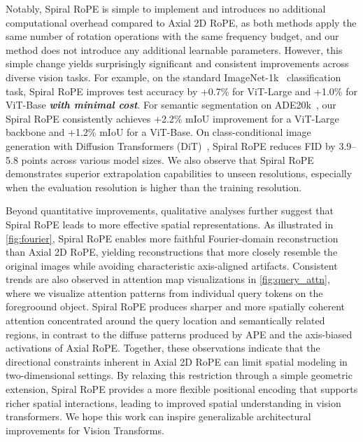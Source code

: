 Notably, Spiral RoPE is simple to implement and introduces no additional computational overhead compared to Axial 2D RoPE, as both methods apply the same number of rotation operations with the same frequency budget, and our method does not introduce any additional learnable parameters. However, this simple change yields surprisingly significant and consistent improvements across diverse vision tasks. For example, on the standard ImageNet-1k~\cite{dengImageNetLargescaleHierarchical2009} classification task, Spiral RoPE improves test accuracy by +0.7\% for ViT-Large and +1.0\% for ViT-Base \textit{\textbf{with minimal cost}}. For semantic segmentation on ADE20k~\cite{zhouSceneParsingADE20K2017a}, our Spiral RoPE consistently achieves +2.2\% mIoU improvement for a ViT-Large backbone and +1.2\% mIoU for a ViT-Base. On class-conditional image generation with Diffusion Transformers (DiT)~\cite{peeblesScalableDiffusionModels2023}, Spiral RoPE reduces FID by 3.9--5.8 points across various model sizes. We also observe that Spiral RoPE demonstrates superior extrapolation capabilities to unseen resolutions, especially when the evaluation resolution is higher than the training resolution.

Beyond quantitative improvements, qualitative analyses further suggest that Spiral RoPE leads to more effective spatial representations. As illustrated in \cref{fig:fourier}, Spiral RoPE enables more faithful Fourier-domain reconstruction than Axial 2D RoPE, yielding reconstructions that more closely resemble the original images while avoiding characteristic axis-aligned artifacts. Consistent trends are also observed in attention map visualizations in \cref{fig:query_attn}, where we visualize attention patterns from individual query tokens on the foregroound object. Spiral RoPE produces sharper and more spatially coherent attention concentrated around the query location and semantically related regions, in contrast to the diffuse patterns produced by APE and the axis-biased activations of Axial RoPE. Together, these observations indicate that the directional constraints inherent in Axial 2D RoPE can limit spatial modeling in two-dimensional settings. By relaxing this restriction through a simple geometric extension, Spiral RoPE provides a more flexible positional encoding that supports richer spatial interactions, leading to improved spatial understanding in vision transformers. We hope this work can inspire generalizable architectural improvements for Vision Transforms.